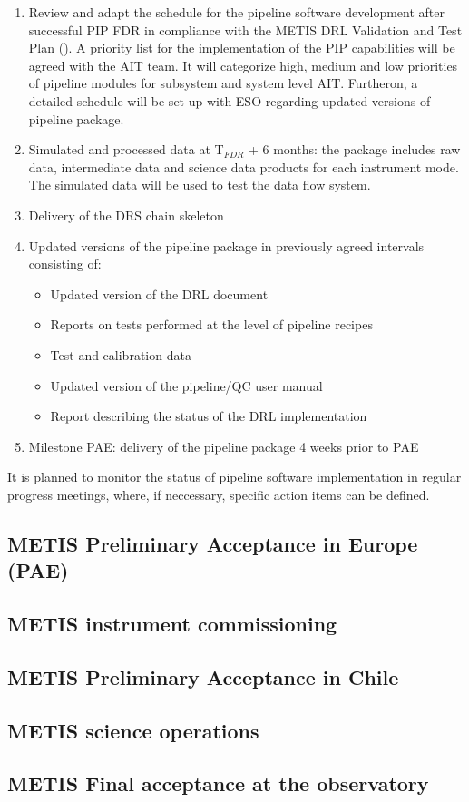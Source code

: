 \begin{enumerate}
    \item Review and adapt the schedule for the pipeline software development after successful PIP FDR in compliance with the METIS DRL Validation and Test Plan (\cite{DRLVT}). A priority list for the implementation of the PIP capabilities will be agreed with the AIT team. It will categorize high, medium and low priorities of pipeline modules for subsystem and system level AIT. Furtheron, a detailed schedule will be set up with ESO regarding updated versions of pipeline package.
    \item Simulated and processed data at T$_{FDR}$ + 6 months: the package includes raw data, intermediate data and science data products for each instrument mode. The simulated data will be used to test the data flow system.
    \item Delivery of the DRS chain skeleton
    \item Updated versions of the pipeline package in previously agreed intervals consisting of:
    \begin{itemize}
        \item Updated version of the DRL document
        \item Reports on tests performed at the level of pipeline recipes
        \item Test and calibration data
        \item Updated version of the pipeline/QC user manual
        \item Report describing the status of the DRL implementation
    \end{itemize}
    
    \item Milestone PAE: delivery of the pipeline package 4 weeks prior to PAE
\end{enumerate}

It is planned to monitor the status of pipeline software implementation in regular progress meetings, where, if neccessary, specific action items can be defined.

\subsection{METIS Preliminary Acceptance in Europe (PAE)}
\label{ssec:pae_europe}

\subsection{METIS instrument commissioning}
\label{ssec:commissioning}

\subsection{METIS Preliminary Acceptance in Chile}
\label{ssec:pae_chile}

\subsection{METIS science operations}
\label{ssec:sciops}

\subsection{METIS Final acceptance at the observatory}
\label{ssec:fao}